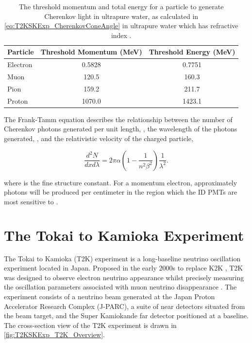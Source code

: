 \begin{table}[ht!]
    \centering
    \begin{tabular}{l|c|c}
      \hline
      Particle & Threshold Momentum (MeV) & Threshold Energy (MeV)\\
      \hline
      Electron & 0.5828 & 0.7751 \\
      Muon & 120.5 & 160.3 \\
      Pion & 159.2 & 211.7 \\
      Proton & 1070.0 & 1423.1 \\
      \hline
      \hline
    \end{tabular}
    \caption{The threshold momentum and total energy for a particle to generate Cherenkov light in ultrapure water, as calculated in \autoref{eq:T2KSKExp_CherenkovConeAngle} in ultrapure water which has refractive index .}
    \label{tab:T2KSKExp_CherenkovThreshold}
\end{table}

The Frank-Tamm equation \cite{Frank1991-wj} describes the relationship between the number of Cherenkov photons generated per unit length, , the wavelength of the photons generated, \quickmath{\lambda}, and the relativistic velocity of the charged particle,

\begin{equation}
  \label{eq:T2KSKExp_FrankTammFormula}
  \frac{d^2N}{dxd\lambda} = 2\pi\alpha \left(1 - \frac{1}{n^2 \beta^2} \right)\frac{1}{\lambda^2} .
\end{equation}

where \quickmath{\alpha} is the fine structure constant. For a  momentum electron, approximately  photons will be produced per centimeter in the  region which the ID PMTs are most sensitive to \cite{Fukuda2003-ly}.

\section{The Tokai to Kamioka Experiment}
\label{sec:T2KSKExp_T2K}

The Tokai to Kamioka (T2K) experiment is a long-baseline neutrino oscillation experiment located in Japan. Proposed in the early 2000s \cite{jhf_loi, Itow2001-vw} to replace K2K \cite{The_K2K_Collaboration2001-oo}, T2K was designed to observe electron neutrino appearance whilst precisely measuring the oscillation parameters associated with muon neutrino disappearance \cite{t2k_proposal}. The experiment consists of a neutrino beam generated at the Japan Proton Accelerator Research Complex (J-PARC), a suite of near detectors situated  from the beam target, and the Super Kamiokande far detector positioned at a  baseline. The cross-section view of the T2K experiment is drawn in \autoref{fig:T2KSKExp_T2K_Overview}.

